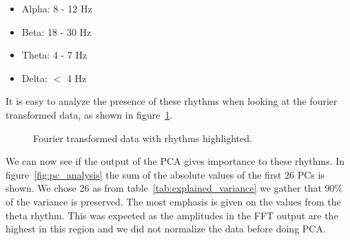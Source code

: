 \begin{itemize}
	\item Alpha: 8 - 12 Hz
	\item Beta: 18 - 30 Hz
	\item Theta: 4 - 7 Hz
	\item Delta: $<$ 4 Hz
\end{itemize}

It is easy to analyze the presence of these rhythms when looking at the fourier transformed data, as shown in figure~\ref{fig:eeg_with_rhythm}.

\begin{figure}
	\centering	
	
	\caption{Fourier transformed data with rhythms highlighted.}
	\label{fig:eeg_with_rhythm}
\end{figure}

We can now see if the output of the PCA gives importance to these rhythms. In figure~\ref{fig:pc_analysis} the sum of the absolute values of the first 26 PCs is shown. We chose 26 as from table~\ref{tab:explained_variance} we gather that 90\% of the variance is preserved. The most emphasis is given on the values from the theta rhythm. This was expected as the amplitudes in the FFT output are the highest in this region and we did not normalize the data before doing PCA.

